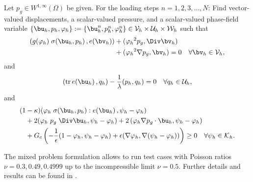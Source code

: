 \begin{Problem}\label{form_mixed_h}
Let $p_g\in W^{1,\infty}(\Omega)$ be given. 
For the loading steps $n=1,2,3,\ldots, N$: Find vector-valued displacements,
a scalar-valued pressure, 
and a
scalar-valued phase-field variable 
$\{\bu_h,p_h,\varphi_h\} := \{\bu_h^n,p_h^n,\varphi_h^n\} \in \mathcal{V}_h \times \mathcal{U}_h \times \mathcal{W}_h$ such that
\begin{equation}\label{eq_u_mixed_disc}
\begin{aligned}
\left(g(\varphi_h)\;\sigma(\bu_h,p_h)\,, e( \bv_h)\right)  
&+({\varphi_h}^{2} p_g, \Div  \bv_h) \\
&+ ({\varphi_h}^{2} \nabla p_g,  \bv_h) 
=0 \quad \forall \bv_h\in \mathcal{V}_h ,
\end{aligned}
\end{equation}
and 
\begin{equation}\label{eq_p_mixed_disc}
\begin{aligned}
(\operatorname{tr}e(\bu_h)\,, q_h) - \frac{1}{\lambda} (p_h,q_h)
=0 \quad \forall q_h\in \mathcal{U}_h,
\end{aligned}
\end{equation}
and
\begin{equation} \label{eq_varphi_mixed_disc}
\begin{aligned}
 (1&-\kappa) (\varphi_h \;\sigma(\bu_h,p_h):e( \bu_h)\,, \psi_h -\varphi_h) \\
&+  2 (\varphi_h\;  p_g\; \Div  \bu_h,\psi_h-\varphi_h)
+ 2\, (\varphi_h \nabla p_g\cdot  \bu_h,\psi_h-\varphi_h) 
\\
&+  G_c  \left( -\frac{1}{\epsilon} (1-\varphi_h,\psi_h-\varphi_h) + \epsilon (\nabla
\varphi_h, \nabla (\psi_h - \varphi_h))   \right)  \geq  0
\quad \forall \psi_h \in \mathcal{K}_h.
\end{aligned}
\end{equation}
\end{Problem}

The mixed problem formulation allows to run test cases with Poisson ratios $\nu=0.3, 0.49, 0.4999$ up to the incompressible limit $\nu=0.5$. 
Further details and results can be found in \cite{basava2020adaptive}.
%



